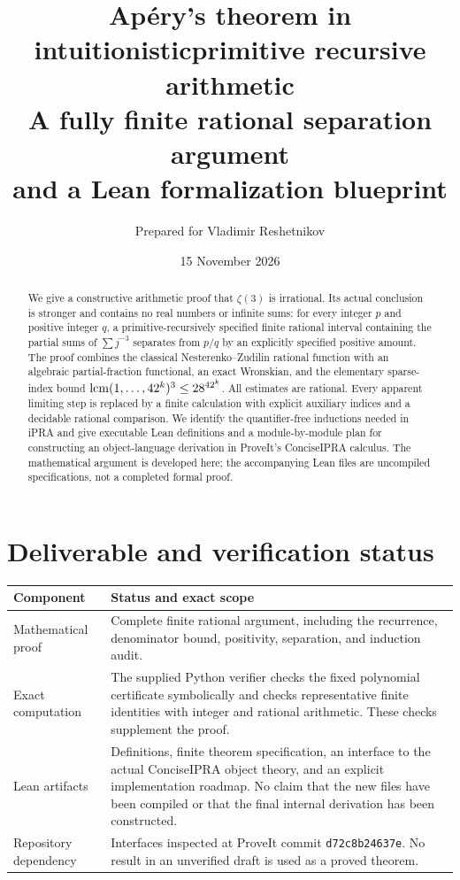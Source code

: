 \documentclass[11pt]{article}
\title{\textbf{Ap\'ery's theorem in intuitionistic\break primitive recursive arithmetic}\\[5pt]
\large A fully finite rational separation argument\\and a Lean formalization blueprint}
\author{Prepared for Vladimir Reshetnikov}
\date{15 November 2026}
\theoremstyle{definition}\newtheorem{definition}[theorem]{Definition}
\theoremstyle{remark}\newtheorem{remark}[theorem]{Remark}
\begin{document}
\maketitle
\begin{abstract}
We give a constructive arithmetic proof that $\zeta(3)$ is irrational.
Its actual conclusion is stronger and contains no real numbers or infinite sums:
for every integer $p$ and positive integer $q$, a primitive-recursively specified
finite rational interval containing the partial sums of $\sum j^{-3}$ separates
from $p/q$ by an explicitly specified positive amount.
The proof combines the classical Nesterenko--Zudilin rational function with
an algebraic partial-fraction functional, an exact Wronskian, and the elementary
sparse-index bound $\operatorname{lcm}(1,\ldots,42^k)^3\le28^{42^k}$.
All estimates are rational. Every apparent limiting step is replaced by a finite
calculation with explicit auxiliary indices and a decidable rational comparison.
We identify the quantifier-free inductions needed in iPRA and give executable
Lean definitions and a module-by-module plan for constructing an object-language
derivation in ProveIt's ConciseIPRA calculus.
The mathematical argument is developed here; the accompanying Lean files are
uncompiled specifications, not a completed formal proof.
\end{abstract}

\section*{Deliverable and verification status}
\begin{center}
\begin{tabular}{p{.26\linewidth}p{.65\linewidth}}
\toprule
Component & Status and exact scope\\\midrule
Mathematical proof & Complete finite rational argument, including the recurrence,
denominator bound, positivity, separation, and induction audit.\\
Exact computation & The supplied Python verifier checks the fixed polynomial
certificate symbolically and checks representative finite identities with
integer and rational arithmetic. These checks supplement the proof.\\
Lean artifacts & Definitions, finite theorem specification, an interface to the
actual ConciseIPRA object theory, and an explicit implementation roadmap.
No claim that the new files have been compiled or that the final internal
derivation has been constructed.\\
Repository dependency & Interfaces inspected at ProveIt commit
\texttt{d72c8b24637e}.
No result in an unverified draft is used as a proved theorem.\\
\bottomrule
\end{tabular}
\end{center}
\newpage
\tableofcontents
\newpage
\end{document}

